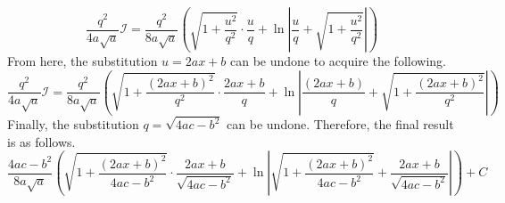 \documentclass[oneside]{book}
\newcommand\tab[1][1cm]{\hspace*{#1}}
\newcommand{\abs}[1]{\left\lvert#1\right\rvert}
\begin{document}
\begin{equation*}
\frac{q^2}{4a\sqrt{a}}\mathcal{I} = \frac{q^2}{8a\sqrt{a}}\left(\sqrt{1+\frac{u^2}{q^2}}\cdot\frac{u}{q} + \ln\abs{\frac{u}{q}+\sqrt{1+\frac{u^2}{q^2}}}\right)
\end{equation*}
\tab
From here, the substitution $u=2ax+b$ can be undone to acquire the following. 
\begin{equation*}
\frac{q^2}{4a\sqrt{a}}\mathcal{I} = \frac{q^2}{8a\sqrt{a}}\left(\sqrt{1+\frac{\left(2ax+b\right)^2}{q^2}}\cdot\frac{2ax+b}{q} + \ln\abs{\frac{\left(2ax+b\right)}{q}+\sqrt{1+\frac{\left(2ax+b\right)^2}{q^2}}}\right)
\end{equation*}
\tab
Finally, the substitution $q=\sqrt{4ac-b^2}$ can be undone. Therefore, the final result is as follows.
\begin{equation*}
\frac{4ac-b^2}{8a\sqrt{a}}\left(\sqrt{1+\frac{(2ax+b)^2}{4ac-b^2}}\cdot\frac{2ax+b}{\sqrt{4ac-b^2}} + \ln\abs{\sqrt{1+\frac{(2ax+b)^2}{4ac-b^2}}+\frac{2ax+b}{\sqrt{4ac-b^2}}}\right) + C
\end{equation*}
\end{document}
